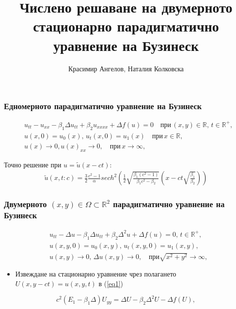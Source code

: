 \documentclass{beamer}
\title{Числено решаване на двумерното стационарно парадигматично уравнение на Бузинеск}
\author{Красимир Ангелов, Наталия Колковска}
\newcommand{\RR}{\mathbb{R}}
\newcommand{\rf}[1]{(\ref{#1})}
\begin{document}
\begin{frame}
\titlepage
\end{frame}


\begin{frame}
\frametitle{ Едномерното парадигматично уравнение на Бузинеск }
\begin{align}
&u_{tt} - u_{xx} -\beta_1  \Delta u_{tt} +\beta_2 u_{xxxx} + \Delta f(u)=0   \quad \text{при} \,  (x,y) \in \RR, \, t\in\RR^+,\label{eq1D}
\\ \nonumber &u(x,0)=u_0(x), \, u_t(x,0)=u_1(x)   \quad\text{при} \, x \in \RR,
\\  &u(x) \rightarrow 0,  u(x)_{xx} \rightarrow 0 ,  \quad \text{при} \, x \rightarrow \infty, \label{eq1d1}
\end{align}

Точно решение при $u =\tilde u(x-ct)$:
\begin{align}
\tilde u(x,t:c) = \frac{3}{2} \frac{c^2-1}{\alpha}sech^2 \left( \frac{1}{2}  \sqrt{ \frac{\beta_1 (c^2-1)}{\beta_1 c^2-\beta_2}} (x-c t \sqrt{\frac{\beta_1}{\beta_2}} ) \right)
\end{align}

\end{frame}

\begin{frame}

\frametitle{ Двумерното $(x,y) \in \Omega \subset \RR^2$ парадигматично уравнение на Бузинеск }

\begin{align}
&u_{tt} - \Delta u -\beta_1  \Delta u_{tt} +\beta_2 \Delta ^2 u + \Delta f(u)=0, \, t\in\RR^+,\label{eq1}
\\ \nonumber &u(x,y,0)=u_0(x,y), \, u_t(x,y,0)=u_1(x,y)  ,
\\  &u(x,y) \rightarrow 0, \,  \Delta u(x,y) \rightarrow 0 ,  \quad \text{при} \sqrt{x^2 + y^2} \rightarrow \infty, \label{eq11}
\end{align}
\begin{itemize}
  \item Извеждане на стационарно уравнение чрез полагането $U(x,y-ct)=u(x,y,t)$ в \rf{eq1}
\end{itemize}
\begin{equation}\label{eq2}
c^2 (E_1-\beta_1 \Delta) U_{yy} = \Delta U -\beta_2 \Delta^2 U - \Delta f(U),
\end{equation}

\end{frame}
\end{document}
